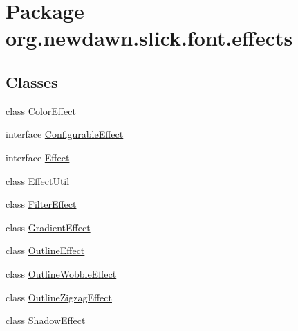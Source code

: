 \hypertarget{namespaceorg_1_1newdawn_1_1slick_1_1font_1_1effects}{}\section{Package org.\+newdawn.\+slick.\+font.\+effects}
\label{namespaceorg_1_1newdawn_1_1slick_1_1font_1_1effects}
\subsection*{Classes}
\begin{DoxyCompactItemize}
\item 
class \mbox{\hyperlink{classorg_1_1newdawn_1_1slick_1_1font_1_1effects_1_1_color_effect}{Color\+Effect}}
\item 
interface \mbox{\hyperlink{interfaceorg_1_1newdawn_1_1slick_1_1font_1_1effects_1_1_configurable_effect}{Configurable\+Effect}}
\item 
interface \mbox{\hyperlink{interfaceorg_1_1newdawn_1_1slick_1_1font_1_1effects_1_1_effect}{Effect}}
\item 
class \mbox{\hyperlink{classorg_1_1newdawn_1_1slick_1_1font_1_1effects_1_1_effect_util}{Effect\+Util}}
\item 
class \mbox{\hyperlink{classorg_1_1newdawn_1_1slick_1_1font_1_1effects_1_1_filter_effect}{Filter\+Effect}}
\item 
class \mbox{\hyperlink{classorg_1_1newdawn_1_1slick_1_1font_1_1effects_1_1_gradient_effect}{Gradient\+Effect}}
\item 
class \mbox{\hyperlink{classorg_1_1newdawn_1_1slick_1_1font_1_1effects_1_1_outline_effect}{Outline\+Effect}}
\item 
class \mbox{\hyperlink{classorg_1_1newdawn_1_1slick_1_1font_1_1effects_1_1_outline_wobble_effect}{Outline\+Wobble\+Effect}}
\item 
class \mbox{\hyperlink{classorg_1_1newdawn_1_1slick_1_1font_1_1effects_1_1_outline_zigzag_effect}{Outline\+Zigzag\+Effect}}
\item 
class \mbox{\hyperlink{classorg_1_1newdawn_1_1slick_1_1font_1_1effects_1_1_shadow_effect}{Shadow\+Effect}}
\end{DoxyCompactItemize}

